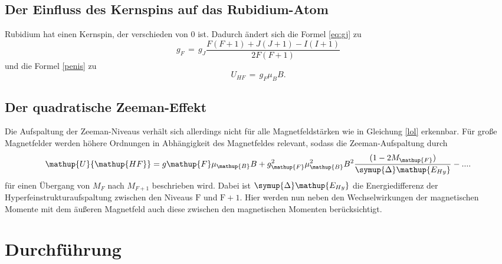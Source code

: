 \documentclass[
  bibliography=totoc,     %
  captions=tableheading,  %
  titlepage=firstiscover, %
]{scrartcl}
\begin{document}
\subsection{Der Einfluss des Kernspins auf das Rubidium-Atom}
Rubidium hat einen Kernspin, der verschieden von 0 ist. Dadurch ändert sich die
Formel \eqref{eq:gj} zu
\begin{equation}
  g_{F}\,=\,g_{J} \frac{F(F+1)+J(J+1)-I(I+1)}{2F(F+1)}
\end{equation}
und die Formel \eqref{penis} zu
\begin{equation}
  U_{HF}\,=\,g_{F}\mu_{B} B.
  \label{lol}
\end{equation}
\subsection{Der quadratische Zeeman-Effekt}

Die Aufspaltung der Zeeman-Niveaus verhält sich allerdings nicht für alle Magnetfeldstärken
wie in Gleichung \eqref{lol} erkennbar. Für große Magnetfelder werden höhere
Ordnungen in Abhängigkeit des Magnetfeldes relevant, sodass die Zeeman-Aufspaltung durch
%
\begin{equation}
  \mathup{U}{\mathup{HF}} = g{\mathup{F}}\mu_{\mathup{B}}B + g_{\mathup{F}}^2\mu_{\mathup{B}}^2B^2\frac{(1-2M_{\mathup{F}})}{\symup{\Delta} \mathup{E_{Hy}}} - ....
  \label{eq:quad_zeeman}
\end{equation}
%
für einen Übergang von $M_F$ nach $M_{F+1}$ beschrieben wird. Dabei ist $\symup{\Delta} \mathup{E_{Hy}}$ die Energiedifferenz der
Hyperfeinstrukturaufspaltung zwischen den Niveaus $\mathup{F}$ und $\mathup{F}+1$.
Hier werden nun neben den Wechselwirkungen der magnetischen Momente mit dem äußeren
Magnetfeld auch diese zwischen den magnetischen Momenten berücksichtigt.

\section{Durchführung}
\label{sec:durchführung}
\end{document}
